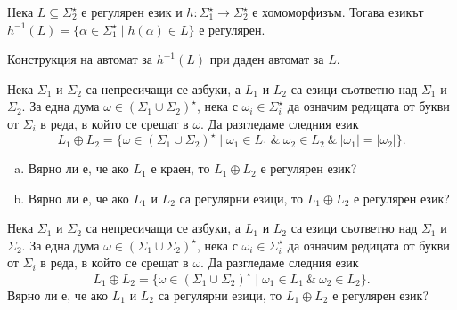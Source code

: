 \begin{problem}
  Нека $L\subseteq \Sigma^\star_2$ е регулярен език и $h:\Sigma^\star_1\to\Sigma^\star_2$ е хомоморфизъм.
  Тогава езикът
  $h^{-1}(L) = \{\alpha \in \Sigma^\star_1 \mid h(\alpha) \in L\}$ е регулярен.  
\end{problem}
\begin{hint}
  Конструкция на автомат за $h^{-1}(L)$ при даден автомат за $L$.
\end{hint}

\begin{problem}
  Нека $\Sigma_1$ и $\Sigma_2$ са непресичащи се азбуки, а $L_1$ и $L_2$ са езици съответно над $\Sigma_1$ и $\Sigma_2$.
  За една дума $\omega \in (\Sigma_1 \cup \Sigma_2)^\star$, нека с $\omega_i \in \Sigma^\star_i$ да означим редицата от букви от $\Sigma_i$
  в реда, в който се срещат в $\omega$. Да разгледаме следния език
  \[L_1 \oplus L_2 = \{\omega \in (\Sigma_1 \cup \Sigma_2)^\star \mid \omega_1 \in L_1\ \&\ \omega_2 \in L_2\ \&\ |\omega_1| = |\omega_2|\}.\]
  \begin{enumerate}[a)]
  \item
    Вярно ли е, че ако $L_1$ е краен, то $L_1 \oplus L_2$ е регулярен език?
  \item
    Вярно ли е, че ако $L_1$ и $L_2$ са регулярни езици, то $L_1 \oplus L_2$ е регулярен език?
  \end{enumerate}
\end{problem}

\begin{problem}
  Нека $\Sigma_1$ и $\Sigma_2$ са непресичащи се азбуки, а $L_1$ и $L_2$ са езици съответно над $\Sigma_1$ и $\Sigma_2$.
  За една дума $\omega \in (\Sigma_1 \cup \Sigma_2)^\star$, нека с $\omega_i \in \Sigma^\star_i$ да означим редицата от букви от $\Sigma_i$
  в реда, в който се срещат в $\omega$. Да разгледаме следния език
  \[L_1 \oplus L_2 = \{\omega \in (\Sigma_1 \cup \Sigma_2)^\star \mid \omega_1 \in L_1\ \&\ \omega_2 \in L_2\}.\]
  Вярно ли е, че ако $L_1$ и $L_2$ са регулярни езици, то $L_1 \oplus L_2$ е регулярен език?
\end{problem}

